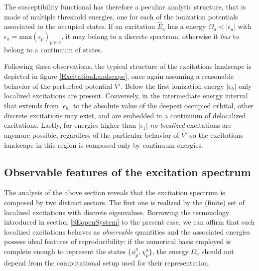 \documentclass[reprint,aps,prb]{revtex4-1}
\newcommand{\eps}{\epsilon}
\newcommand{\op}[1]{\hat {#1}}
\begin{document}
The susceptibility functional has therefore a peculiar analytic structure, that
is made of multiple threshold energies, one for each of the ionization potentials
associated to the occupied states. 
If an excitation $\op E_a$ has a energy $\Omega_a < |\eps_a|$ with $\eps_a = \mathrm{max}\left(\eps_p\right)_{p\in a}$,
it may belong to a discrete spectrum; otherwise it \emph{has} to belong to a continuum of states. 

Following these observations, the typical structure of the excitations landscape is depicted in figure \ref{ExcitationLandscape}, once again assuming a reasonable 
behavior of the perturbed potential $\op V'$.
Below the first ionization energy $|\eps_h|$ only localized excitations are present. Conversely, in the intermediate energy interval that extends from $|\eps_h|$ to the 
absolute value of the deepest occupied orbital, other discrete excitations may exist, and are embedded in a continuum of delocalized excitations. 
Lastly, for energies higher than $|\eps_1|$ \emph{no localized} excitations are anymore possible,
regardless of the particular behavior of $\op V'$ so the excitations landscape in this region is composed only by continuum energies.

\subsection{Observable features of the excitation spectrum}

The analysis of the above section reveals that the excitation spectrum is composed by two distinct sectors. 
The first one is realized by the (finite) set of localized excitations with discrete eigenvalues. 
Borrowing the terminology introduced in section \ref{SEopenSystem} to the present case, we can affirm that such localized excitations behaves as
\emph{observable} quantities and the associated energies possess ideal features of reproducibility:
if the numerical basis employed is complete enough to
represent the states $\{\phi_p^a,\chi_p^a\}$, the energy $\Omega_a$ 
should not depend from the computational setup used for their representation.
\end{document}
